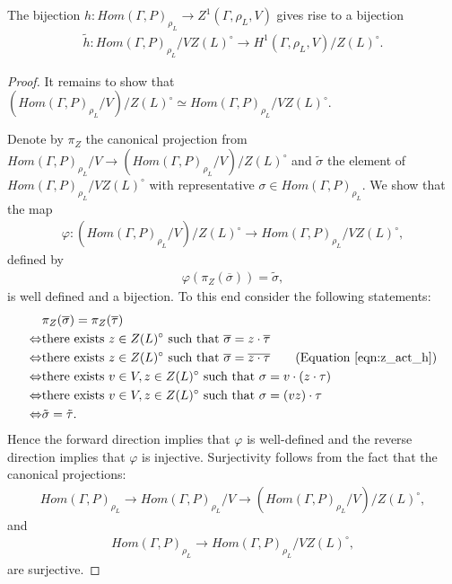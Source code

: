 \begin{lemma}
  The bijection $h: Hom(\Gamma, P)_{\rho_L} \rightarrow Z^1(\Gamma, \rho_L, V)$ gives rise to a bijection
  \begin{align*}
    \tilde{h}: Hom(\Gamma, P)_{\rho_L}/VZ(L)^\circ \rightarrow H^1(\Gamma, \rho_L, V)/Z(L)^\circ.
  \end{align*}
  \label{lem:vzl_h1zl}
\end{lemma}
\begin{proof}
  It remains to show that $\left(Hom(\Gamma, P)_{\rho_L}/V\right)/Z(L)^\circ \simeq Hom(\Gamma, P)_{\rho_L}/VZ(L)^\circ$.

  Denote by $\pi_Z$ the canonical projection from $Hom(\Gamma, P)_{\rho_L}/V \rightarrow \left( Hom(\Gamma, P)_{\rho_L}/V \right)/Z(L)^\circ$ and $\tilde{\sigma}$ the element of $Hom(\Gamma, P)_{\rho_L}/VZ(L)^\circ$ with representative $\sigma \in Hom(\Gamma, P)_{\rho_L}$. We show that the map
  \begin{align*}
    \varphi: (Hom(\Gamma, P)_{\rho_L}/V)/Z(L)^\circ \rightarrow Hom(\Gamma, P)_{\rho_L}/VZ(L)^\circ,
  \end{align*}
  defined by
  \begin{align*}
    \varphi(\pi_Z(\overline{\sigma})) = \tilde{\sigma},
  \end{align*}
  is well defined and a bijection. To this end consider the following statements:
  \begin{align*}
    & \pi_Z(\overline{\sigma}) = \pi_Z(\overline{\tau}) \\
    \Leftrightarrow& \textrm{there exists } z \in Z(L)^\circ \textrm{ such that } \overline{\sigma} = z \cdot \overline{\tau} \\
    \Leftrightarrow& \textrm{there exists } z \in Z(L)^\circ \textrm{ such that } \overline{\sigma} = \overline{z \cdot \tau} \qquad (\textrm{Equation } \ref{eqn:z_act_h}) \\
    \Leftrightarrow& \textrm{there exists } v \in V, z \in Z(L)^\circ \textrm{ such that } \sigma = v \cdot (z \cdot \tau) \\
    \Leftrightarrow& \textrm{there exists } v \in V, z \in Z(L)^\circ \textrm{ such that } \sigma = (vz) \cdot \tau \\
    \Leftrightarrow& \tilde{\sigma} = \tilde{\tau}.
  \end{align*}
  Hence the forward direction implies that $\varphi$ is well-defined and the reverse direction implies that $\varphi$ is injective. Surjectivity follows from the fact that the canonical projections:
  \begin{align*}
    Hom(\Gamma, P)_{\rho_L} \rightarrow Hom(\Gamma, P)_{\rho_L}/V \rightarrow (Hom(\Gamma, P)_{\rho_L}/V)/Z(L)^\circ, 
  \end{align*}
  and
  \begin{align*}
    Hom(\Gamma, P)_{\rho_L} \rightarrow Hom(\Gamma, P)_{\rho_L}/VZ(L)^\circ, 
  \end{align*}
  are surjective.
\end{proof}

